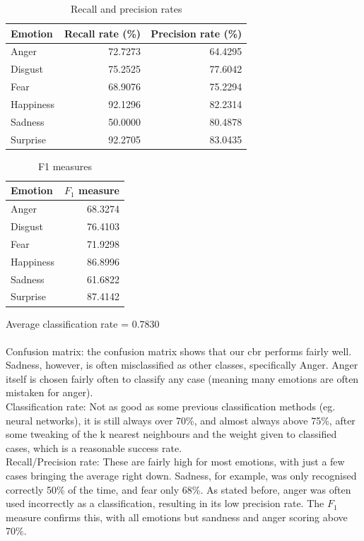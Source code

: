 \documentclass[12pt]{article}
\begin{document}
\begin{table}
\centering
\begin{tabular}{l | r r}
Emotion & Recall rate (\%) & Precision rate (\%) \\
\hline
Anger     & 72.7273 & 64.4295 \\
Disgust   & 75.2525 & 77.6042 \\
Fear      & 68.9076 & 75.2294 \\
Happiness & 92.1296 & 82.2314 \\
Sadness   & 50.0000 & 80.4878 \\
Surprise  & 92.2705 & 83.0435 \\
\end{tabular}
\caption{Recall and precision rates}
\end{table}

\begin{table}
\centering
\begin{tabular}{l | r}
Emotion & \( F_1 \) measure \\
\hline
Anger     & 68.3274 \\
Disgust   & 76.4103 \\
Fear      & 71.9298 \\
Happiness & 86.8996 \\
Sadness   & 61.6822 \\
Surprise  & 87.4142 \\
\end{tabular}
\caption{F1 measures}
\end{table}

Average classification rate = 0.7830 \\ \\

Confusion matrix: the confusion matrix shows that our cbr performs fairly well. Sadness, however, is often misclassified as other classes, specifically Anger. Anger itself is chosen fairly often to classify any case (meaning many emotions are often mistaken for anger). \\
Classification rate: Not as good as some previous classification methods (eg. neural networks), it is still always over 70\%, and almost always above 75\%, after some tweaking of the k nearest neighbours and the weight given to classified cases, which is a reasonable success rate. \\
Recall/Precision rate: These are fairly high for most emotions, with just a few cases bringing the average right down. Sadness, for example, was only recognised correctly 50\% of the time, and fear only 68\%. As stated before, anger was often used incorrectly as a classification, resulting in its low precision rate. The $F_1$ measure confirms this, with all emotions but sandness and anger scoring above 70\%. \\
\end{document}
